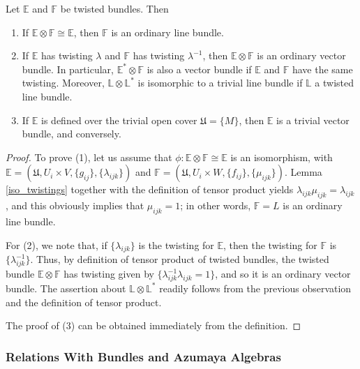 \begin{lemma}\label{prop_tvb}
Let $\mathbb{E}$ and $\mathbb{F}$ be twisted bundles. Then
\begin{enumerate}
\item If $\mathbb{E} \otimes \mathbb{F}\cong \mathbb{E}$, then $\mathbb{F}$ is an ordinary line bundle.
\item If $\mathbb{E}$ has twisting $\lambda$ and $\mathbb{F}$ has twisting $\lambda^{-1}$, then $\mathbb{E}\otimes \mathbb{F}$ is an ordinary vector bundle. In particular, $\mathbb{E}^*\otimes \mathbb{F}$ is also a vector bundle if $\mathbb{E}$ and $\mathbb{F}$ have the same twisting. Moreover, $\mathbb{L}\otimes \mathbb{L}^*$ is isomorphic to a trivial line bundle if $\mathbb{L}$ a twisted line bundle.
\item If $\mathbb{E}$ is defined over the trivial open cover $\mathfrak{U}=\{M\}$, then $\mathbb{E}$ is a trivial vector bundle, and conversely.
\end{enumerate}
\end{lemma}
\begin{proof}
To prove (1), let us assume that $\phi :\mathbb{E}\otimes \mathbb{F}\cong \mathbb{E}$ is an isomorphism, with $\mathbb{E}=(\mathfrak{U},U_i\times V,\{g_{ij}\},\{\lambda_{ijk}\})$ and $\mathbb{F}=(\mathfrak{U},U_i\times W,\{f_{ij}\},\{\mu_{ijk}\})$. Lemma \ref{iso_twistings} together with the definition of tensor product yields $\lambda_{ijk}\mu_{ijk}=\lambda_{ijk}$, and this obviously implies that $\mu_{ijk}=1$; in other words, $\mathbb{F}=L$ is an ordinary line bundle.

For (2), we note that, if $\{\lambda_{ijk}\}$ is the twisting for $\mathbb{E}$, then the twisting for $\mathbb{F}$ is $\{\lambda_{ijk}^{-1}\}$. Thus, by definition of tensor product of twisted bundles, the twisted bundle $\mathbb{E}\otimes \mathbb{F}$ has twisting given by $\{\lambda_{ijk}^{-1}\lambda_{ijk}=1\}$, and so it is an ordinary vector bundle. The assertion about $\mathbb{L}\otimes \mathbb{L}^*$ readily follows from the previous observation and the definition of tensor product.

The proof of (3) can be obtained immediately from the definition.
\end{proof}


\subsubsection{Relations With Bundles and Azumaya Algebras}

